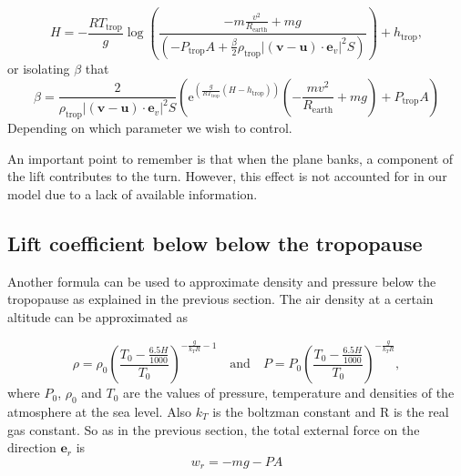 \documentclass{article}
\renewcommand{\vec}[1]{\boldsymbol{#1}}
\begin{document}

\begin{equation}
    H= - \frac{RT_{\text{trop}}}{g}\log \left(\frac{-m\frac{v^2}{R_{\text{earth}}} +mg}{\left(-  P_{\text{trop}}A +\frac{\beta }{2} \rho_{\text{trop}} |(\vec{v}-\vec{u})\cdot \vec e_v|^2S\right)}\right)+h_{\text{trop}},
\end{equation}
or isolating $\beta$ that
\begin{equation}
\beta=    \frac{2}{\rho_{\text{trop}}|(\vec{v}-\vec{u})\cdot \vec e_v|^2S} \left( \mathrm{e}^{\left( \frac{g}{RT_{\text{trop}}}(H-h_{\text{trop}}) \right)} \left( -\frac{m v^2}{R_{\text{earth}}}+mg\right) + P_{\text{trop}}A  \right)
\end{equation}
Depending on which parameter we wish to control. 

An important point to remember is that when the plane banks, a component of the lift contributes to the turn. However, this effect is not accounted for in our model due to a lack of available information.

\subsection{Lift coefficient below below the tropopause}

Another formula can be used to approximate density and pressure below the tropopause as explained in the previous section. The air density at a certain altitude can be approximated as \cite{nuic2004bada}

\begin{equation}
    \rho= \rho_0 \left(\frac{T_0-\frac{6.5H}{1000}}{T_0}\right)^{-\frac{g}{k_TR}-1} \quad \text{and} \quad P=P_0\left(\frac{T_0-\frac{6.5H}{1000}}{T_0}\right)^{-\frac{g}{k_TR}},
\end{equation} 
where $P_0$, $\rho_0$ and $T_0$ are the values of pressure, temperature and densities of the atmosphere at the sea level. Also $k_T$ is the boltzman constant and R is the real gas constant.
So as in the previous section, the total external force on the direction $\vec{e}_r$ is 
\begin{equation}
    w_r=-mg -PA 
\end{equation}
\end{document}
